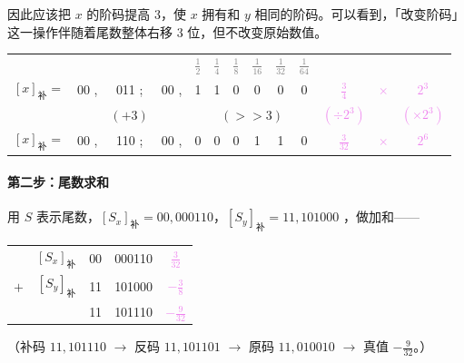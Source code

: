 \documentclass[UTF8]{ctexart}
\newcommand\littleword[1]{\textcolor{gray}{\footnotesize #1}}
\begin{document}
因此应该把 $x$ 的阶码提高 3，使 $x$ 拥有和 $y$ 相同的阶码。可以看到，「改变阶码」这一操作伴随着尾数整体右移 3 位，但不改变原始数值。

\begin{table}[htb]
  \centering
  \begin{tabular}{cccccccccc|ccc}
  & & & & \littleword{$\frac12$} & \littleword{$\frac14$} & \littleword{$\frac18$} & \littleword{$\frac1{16}$} & \littleword{$\frac1{32}$} & \littleword{$\frac1{64}$} & & &\\
  $[x]_{\text{补}}=$ & 00 ,& 011 ;& 00 ,& 1&1&0&0&0&0 & \textcolor{violet}{$\frac34$} & \textcolor{violet}{$\times$} & \textcolor{violet}{$2^3$} \\
  & & $(+3)$ & & \multicolumn{6}{c}{$(>>3)$} & \textcolor{violet}{$(\div 2^3)$} & & \textcolor{violet}{$(\times 2^3)$}\\
  $[x]_{\text{补}}=$ & 00 ,& 110 ;& 00 ,& 0&0&0&1&1&0 & \textcolor{violet}{$\frac{3}{32}$} & \textcolor{violet}{$\times$} & \textcolor{violet}{$2^6$} \\
  \end{tabular}
\end{table}


\paragraph{第二步：尾数求和} 用 $S$ 表示尾数，$[S_x]_{\text{补}} = 00,000110$，$[S_y]_{\text{补}} = 11,101000$ ，做加和——
\begin{table}[htb]
  \centering
  \begin{tabular}{lr@{\quad}c@{\ ,\ }c@{\qquad}c}
      & $[S_x]_{\text{补}}$ & 00 & 000110 & \textcolor{violet}{$\frac3{32}$}\\
  $+$ & $[S_y]_{\text{补}}$ & 11 & 101000 & \textcolor{violet}{$-\frac{3}{8}$}\\
  \hline
      & & 11 & 101110 & \textcolor{violet}{$-\frac{9}{32}$}\\
  \end{tabular}
\end{table}

（补码 $11,101110$ $\to$ 反码 $11,101101$ $\to$ 原码 $11,010010$ $\to$ 真值 $-\frac{9}{32}$。）
\end{document}
